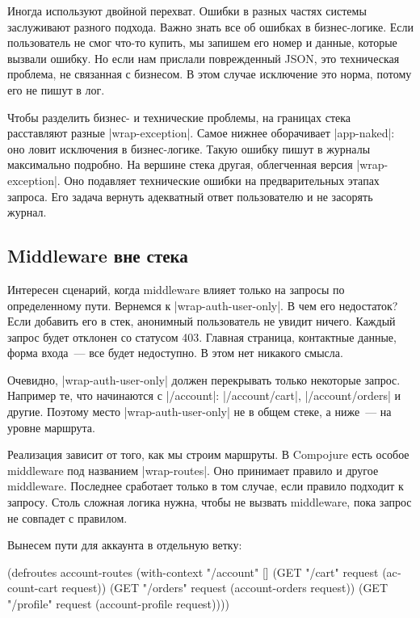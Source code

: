 Иногда используют двойной перехват. Ошибки в разных частях системы заслуживают
разного подхода. Важно знать все об ошибках в бизнес-логике. Если пользователь
не смог что-то купить, мы запишем его номер и данные, которые вызвали ошибку. Но
если нам прислали поврежденный JSON, это техническая проблема, не связанная с
бизнесом. В этом случае исключение это норма, потому его не пишут в лог.

Чтобы разделить бизнес- и технические проблемы, на границах стека расставляют
разные \spverb|wrap-exception|. Самое нижнее оборачивает \spverb|app-naked|: оно
ловит исключения в бизнес-логике. Такую ошибку пишут в журналы максимально
подробно. На вершине стека другая, облегченная версия \spverb|wrap-exception|.
Оно подавляет технические ошибки на предварительных этапах запроса. Его задача
вернуть адекватный ответ пользователю и не засорять журнал.

\subsection{Middleware вне стека}

Интересен сценарий, когда middleware влияет только на запросы по определенному
пути. Вернемся к \spverb|wrap-auth-user-only|. В чем его недостаток? Если
добавить его в стек, анонимный пользователь не увидит ничего. Каждый запрос
будет отклонен со статусом 403. Главная страница, контактные данные, форма
входа~--- все будет недоступно. В этом нет никакого смысла.

Очевидно, \spverb|wrap-auth-user-only| должен перекрывать только некоторые
запрос. Например те, что начинаются с \spverb|/account|: \spverb|/account/cart|,
\spverb|/account/orders| и другие. Поэтому место \spverb|wrap-auth-user-only| не
в общем стеке, а ниже~--- на уровне маршрута.

Реализация зависит от того, как мы строим маршруты. В Compojure есть особое
middleware под названием \spverb|wrap-routes|. Оно принимает правило и другое
middleware. Последнее сработает только в том случае, если правило подходит к
запросу. Столь сложная логика нужна, чтобы не вызвать middleware, пока запрос не
совпадет с правилом.

Вынесем пути для аккаунта в отдельную ветку:

\begin{english}
  \begin{clojure}
(defroutes account-routes
  (with-context "/account" []
    (GET "/cart" request (account-cart request))
    (GET "/orders" request (account-orders request))
    (GET "/profile" request (account-profile request))))
  \end{clojure}
\end{english}

